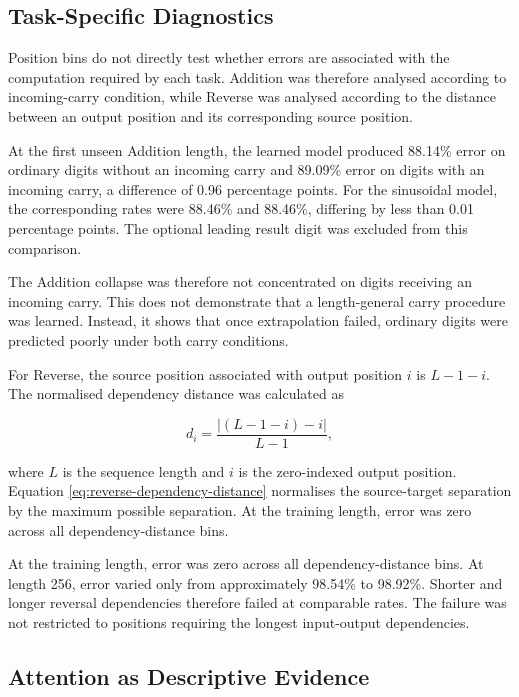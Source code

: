 \documentclass[
    author={Aanchala Ravindra Bhongade},
    supervisor={Dr. Fernando Moreno-Pino},
    degree={MSc},
    title={Length Generalisation in Transformer-Based Sequence Models: Failure Taxonomy and Mitigation Strategies},
    subtitle={},
    type={},
    year={2026}
]{dissertation}
\begin{document}
\subsection{Task-Specific Diagnostics}
\label{sec:task-specific-failure}

Position bins do not directly test whether errors are associated with the computation required by each task. Addition was therefore analysed according to incoming-carry condition, while Reverse was analysed according to the distance between an output position and its corresponding source position.

At the first unseen Addition length, the learned model produced 88.14\% error on ordinary digits without an incoming carry and 89.09\% error on digits with an incoming carry, a difference of 0.96 percentage points. For the sinusoidal model, the corresponding rates were 88.46\% and 88.46\%, differing by less than 0.01 percentage points. The optional leading result digit was excluded from this comparison.

The Addition collapse was therefore not concentrated on digits receiving an incoming carry. This does not demonstrate that a length-general carry procedure was learned. Instead, it shows that once extrapolation failed, ordinary digits were predicted poorly under both carry conditions.

For Reverse, the source position associated with output position \(i\) is
\(L-1-i\). The normalised dependency distance was calculated as

\begin{equation}
d_i =
\frac{\left|(L-1-i)-i\right|}{L-1},
\label{eq:reverse-dependency-distance}
\end{equation}

where \(L\) is the sequence length and \(i\) is the zero-indexed output position. Equation \ref{eq:reverse-dependency-distance} normalises the source-target separation by the maximum possible separation. At the training length, error was zero across all dependency-distance bins.

At the training length, error was zero across all dependency-distance bins. At length 256, error varied only from approximately 98.54\% to 98.92\%. Shorter and longer reversal dependencies therefore failed at comparable rates. The failure was not restricted to positions requiring the longest input-output dependencies.

\subsection{Attention as Descriptive Evidence}
\label{sec:attention-behaviour}
\end{document}

